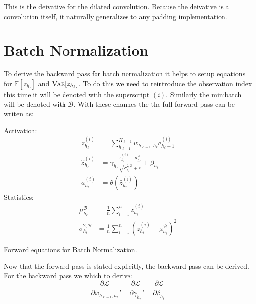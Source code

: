 This is the deivative for the dilated convolution. Because the deivative is a convolution itself, it naturally generalizes to any padding implementation. 

\clearpage
\section{Batch Normalization}
\label{appendix:backward-pass:batch-norm}

To derive the backward pass for batch normalization it helps to setup equations for $\mathbb{E}[z_{h_\ell}]$ and $\textsc{Var}[z_{h_\ell}]$. To do this we need to reintroduce the observation index this time it will be denoted with the superscript $(i)$. Similarly the minibatch will be denoted with $\mathcal{B}$. With these chanhes the the full forward pass can be writen as:
\begin{equationbox}[H]
Activation:
\begin{equation*}
\begin{aligned}
z_{h_\ell}^{(i)} &= \sum_{h_{\ell-1}}^{H_{\ell-1}} w_{h_{\ell-1},h_\ell} a_{h_\ell-1}^{(i)} \\
\hat{z}_{h_\ell}^{(i)} &= \gamma_{h_\ell} \frac{z_{h_\ell}^{(i)} - \mu_{h_\ell}^{\mathcal{B}}}{\sqrt{\sigma_{h_\ell}^{2,\mathcal{B}} + \epsilon}} + \beta_{h_\ell} \\
a_{h_\ell}^{(i)} &= \theta\left(\hat{z}_{h_\ell}^{(i)}\right)
\end{aligned}
\end{equation*}
Statistics:
\begin{equation*}
\begin{aligned}
\mu_{h_\ell}^{\mathcal{B}} &= \frac{1}{n} \sum_{i=1}^n z_{h_\ell}^{(i)} \\
\sigma_{h_\ell}^{2, \mathcal{B}} &= \frac{1}{n} \sum_{i=1}^n (z_{h_\ell}^{(i)} - \mu_{h_\ell}^{\mathcal{B}})^2
\end{aligned}
\end{equation*}
\caption{Forward equations for Batch Normalization.}
\end{equationbox}

Now that the forward pass is stated explicitly, the backward pass can be derived. For the backward pass we which to derive:
\begin{equation}
\frac{\partial \mathcal{L}}{\partial w_{h_{\ell-1},h_\ell}},\quad \frac{\partial \mathcal{L}}{\partial \gamma_{h_\ell}},\quad \frac{\partial \mathcal{L}}{\partial \beta_{h_\ell}}
\end{equation}


